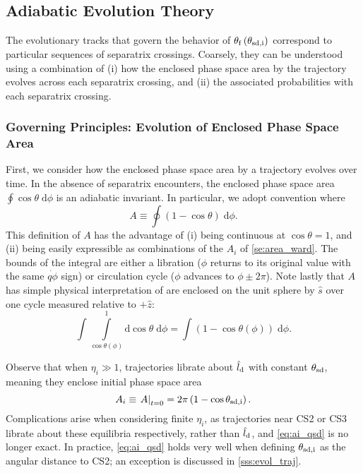 \documentclass[
        fleqn,
        usenatbib,
        referee,
    ]{mnras}
\newcommand*{\at}[1]{\left.#1\right|}
\newcommand*{\p}[1]{\left(#1\right)}
\begin{document}
\subsection{Adiabatic Evolution Theory}\label{ss:zone_transitions}

The evolutionary tracks that govern the behavior of $\theta_{\rm
f}\p{\theta_{\rm sd, i}}$ correspond to particular sequences of separatrix
crossings. Coarsely, they can be understood using a combination of (i) how the
enclosed phase space area by the trajectory evolves across each separatrix
crossing, and (ii) the associated probabilities with each separatrix crossing.

\subsubsection{Governing Principles: Evolution of Enclosed Phase Space
Area}\label{sss:a_evo}

First, we consider how the enclosed phase space area by a trajectory evolves
over time. In the absence of separatrix encounters, the enclosed phase space
area $\oint \cos\theta \;\mathrm{d}\phi$ is an adiabatic invariant. In
particular, we adopt convention where
\begin{equation}
    A \equiv \oint \p{1 - \cos \theta}\;\mathrm{d}\phi.\label{eq:a_oint}
\end{equation}
This definition of $A$ has the advantage of (i) being continuous at $\cos \theta
= 1$, and (ii) being easily expressible as combinations of the $A_i$ of
\autoref{se:area_ward}. The bounds of the integral are either a libration
($\phi$ returns to its original value with the same $\dot{q\phi}$ sign) or
circulation cycle ($\phi$ advances to $\phi \pm 2\pi$). Note lastly that $A$ has
simple physical interpretation of are enclosed on the unit sphere by $\hat{s}$
over one cycle measured relative to $+\hat{z}$:
\begin{equation}
    \int \int\limits_{\cos \theta(\phi)}^1
        \mathrm{d}\cos\theta\;\mathrm{d}\phi = \int \p{1 - \cos \theta(\phi)}
            \;\mathrm{d}\phi.
\end{equation}

Observe that when $\eta_i \gg 1$, trajectories librate about $\hat{l}_{\rm d}$
with constant $\theta_{\rm sd}$, meaning they enclose initial phase space area
\begin{equation}
    A_i \equiv \at{A}_{t = 0}
        = 2\pi\p{1 - \cos \theta_{\rm sd, i}}.\label{eq:ai_qsd}
\end{equation}
Complications arise when considering finite $\eta_i$, as trajectories near CS2
or CS3 librate about these equilibria respectively, rather than $\hat{l}_{\rm
d}$, and \autoref{eq:ai_qsd} is no longer exact. In practice,
\autoref{eq:ai_qsd} holds very well when defining $\theta_{\rm sd, i}$ as the
angular distance to CS2; an exception is discussed in \autoref{sss:evol_traj}.
\end{document}
